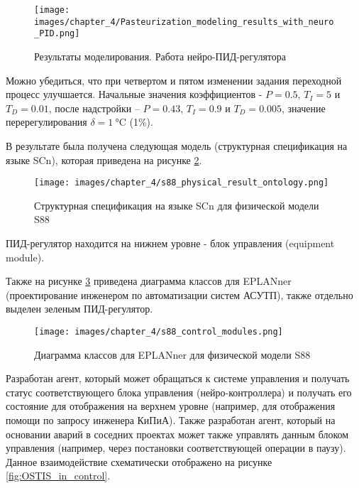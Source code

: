 \begin{figure}[H]
    \centering
    \texttt{[image: images/chapter\_4/Pasteurization\_modeling\_results\_with\_neuro\_PID.png]}
    \caption{Результаты моделирования. Работа нейро-ПИД-регулятора}
    \label{fig:Pasteurization_modeling_results_with_neuro_PID}
\end{figure}

Можно убедиться, что при четвертом и пятом изменении задания переходной процесс улучшается. Начальные значения коэффициентов - $P = 0.5$, $T_I = 5$ и $T_D = 0.01$, после надстройки – $P = 0.43$, $T_I = 0.9$ и $T_D = 0.005$, значение перерегулирования $\delta = \SI{1}{\celsius}$ (1\%).

В результате была получена следующая модель (структурная спецификация на языке SCn), которая приведена на рисунке \ref{fig:s88_physical_result_ontology}.

\begin{figure}[H]
    \centering
    \texttt{[image: images/chapter\_4/s88\_physical\_result\_ontology.png]}
    \caption{Структурная спецификация на языке SCn для физической модели S88}
    \label{fig:s88_physical_result_ontology}
\end{figure}

ПИД-регулятор находится на нижнем уровне - блок управления (equipment module).

Также на рисунке \ref{fig:s88_control_modules} приведена диаграмма классов для EPLANner (проектирование инженером по автоматизации систем АСУТП), также отдельно выделен зеленым ПИД-регулятор.

\begin{figure}[H]
    \centering
    \texttt{[image: images/chapter\_4/s88\_control\_modules.png]}
    \caption{Диаграмма классов для EPLANner для физической модели S88}
    \label{fig:s88_control_modules}
\end{figure}

Разработан агент, который может обращаться к системе управления и получать статус соответствующего блока управления (нейро-контроллера) и получать его состояние для отображения на верхнем уровне (например, для отображения помощи по запросу инженера КиПиА). Также разработан агент, который на основании аварий в соседних проектах может также управлять данным блоком управления (например, через постановки соответствующей операции в паузу). Данное взаимодействие схематически отображено на рисунке \ref{fig:OSTIS_in_control}.


